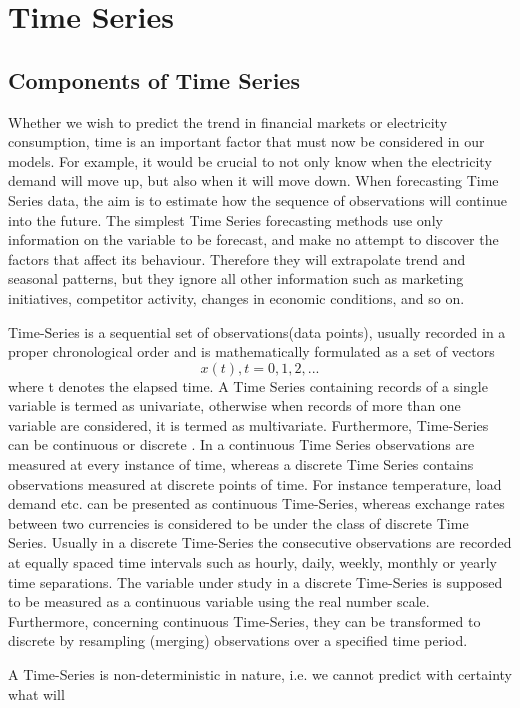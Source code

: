 \chapter{Time Series}
\section{Components of Time Series}
Whether we wish to predict the trend in financial markets or electricity consumption, time is an important factor that must now be considered in our models. For example, it would be crucial to not only know when the electricity demand will move up, but also when it will move down. When forecasting Time Series data, the aim is to estimate how the sequence of observations will continue into the future. The simplest Time Series forecasting methods use only information on the variable to be forecast, and make no attempt to discover the factors that affect its behaviour. Therefore they will extrapolate trend and seasonal patterns, but they ignore all other information such as marketing initiatives, competitor activity, changes in economic conditions, and so on. 
\par Time-Series is a sequential set of observations(data points), usually recorded in a proper chronological order and is mathematically formulated as a set of vectors$$ x(t),t = 0,1,2,... $$ where t denotes the elapsed time. A Time Series containing records of a single variable is termed as univariate, otherwise when records of more than one variable are considered, it is termed as multivariate. Furthermore, Time-Series can be continuous or discrete \cite{chatfield2003analysis}. In a continuous Time Series observations are measured at every instance of time, whereas a discrete Time Series contains observations measured at discrete points of
time. For instance temperature, load demand etc. can be presented as continuous Time-Series, whereas exchange rates between two currencies is considered to be under the class of discrete Time Series. Usually in a discrete Time-Series the consecutive observations are recorded at equally spaced time intervals such as hourly, daily, weekly, monthly or yearly time separations. The variable under study in a discrete Time-Series is supposed to be measured as a continuous variable using the real number scale.
Furthermore, concerning continuous Time-Series, they can be transformed to discrete by resampling (merging) observations over a specified time period.
\par A Time-Series is non-deterministic in nature, i.e. we cannot predict with certainty what will
